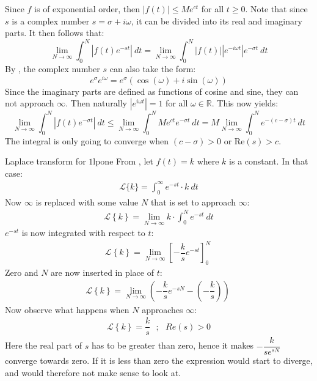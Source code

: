 \begin{prof}{}{}
Since $f$ is of exponential order, then $|f(t)| \leq Me^{ct}$ for all $t \geq 0$. Note that since $s$ is a complex number  $s=\sigma+i\omega$, it can be divided into its real and imaginary parts. It then follows that: $$\lim_{N \to \infty} \int_{0}^{N} |f(t)e^{-st}|\ dt = \lim_{N \to \infty} \int_{0}^{N} |f(t)| |e^{-i\omega t}|e^{-\sigma t}\ dt$$
By , the complex number $s$ can also take the form: 
$$e^{\sigma}e^{i\omega}= e^{\sigma}(\cos(\omega)+i\sin(\omega))$$
Since the imaginary parts are defined as functions of cosine and sine, they can not approach $\infty$. Then naturally $|e^{i\omega t}|=1$ for all $\omega \in \mathbb{R}$. This now yields: $$\lim_{N \to \infty} \int_{0}^{N} |f(t)e^{-\sigma t}|\ dt \leq \lim_{N \to \infty} \int_{0}^{N} Me^{ct}e^{-\sigma t}\ dt = M \lim_{N \to \infty} \int_{0}^{N}e^{-(c-\sigma)t}\ dt $$ The integral is only going to converge when $(c-\sigma)>0$ or Re$(s)>c$.
\end{prof}

\begin{example}{Laplace transform for $1$}{lpone}
From , let $f(t)=k$ where $k$ is a constant. In that case:
\begin{align*}
\mathcal{L}\{k\}=\int_{0}^{\infty} e^{-st} \cdot k\ dt
\end{align*}
Now $\infty$ is replaced with some value $N$ that is set to approach $\infty$:
\begin{align*}
\mathcal{L} \left\{k \right\}= \lim_{N \to \infty} k\cdot \int_{0}^{N} e^{-st}\ dt
\end{align*}
$e^{-st}$ is now integrated with respect to $t$:
\begin{align*}
\mathcal{L} \left\{k \right\}= \lim_{N \to \infty} \left[ -\dfrac{k}{s} e^{-st} \right]_{0}^{N} \ 
\end{align*}
Zero and $N$ are now inserted in place of $t$:
\begin{align*}
\mathcal{L} \left\{k \right\}= \lim_{N \to \infty} \left( -\dfrac{k}{s} e^{-sN} - \left(-\dfrac{k}{s}\right) \right) \ 
\end{align*}
Now observe what happens when $N$ approaches $\infty$:
\begin{align*}
\mathcal{L} \left\{k \right\}=\dfrac{k}{s} \ \ \ ; \ \ \ Re(s) > 0
\end{align*}
Here the real part of $s$ has to be greater than zero, hence it makes $-\dfrac{k}{se^{sN}}$ converge towards zero. If it is less than zero the expression would start to diverge, and would therefore not make sense to look at.
\end{example}

